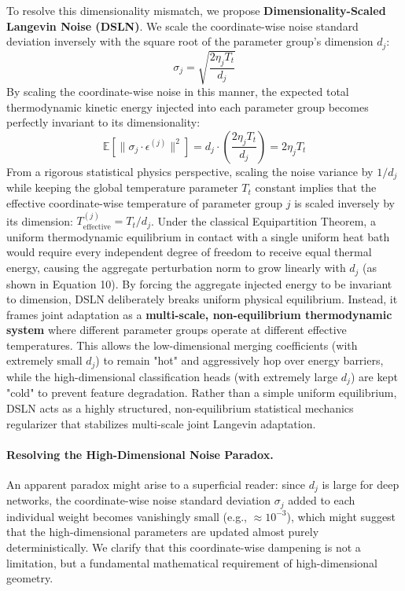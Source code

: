 To resolve this dimensionality mismatch, we propose \textbf{Dimensionality-Scaled Langevin Noise (DSLN)}.
We scale the coordinate-wise noise standard deviation inversely with the square root of the parameter group's dimension $d_j$:
\begin{equation}
    \sigma_j = \sqrt{\frac{2 \eta_j T_t}{d_j}}
\end{equation}
By scaling the coordinate-wise noise in this manner, the expected total thermodynamic kinetic energy injected into each parameter group becomes perfectly invariant to its dimensionality:
\begin{equation}
    \mathbb{E}\left[\|\sigma_j \cdot \epsilon^{(j)}\|^2\right] = d_j \cdot \left(\frac{2 \eta_j T_t}{d_j}\right) = 2 \eta_j T_t
\end{equation}
From a rigorous statistical physics perspective, scaling the noise variance by $1/d_j$ while keeping the global temperature parameter $T_t$ constant implies that the effective coordinate-wise temperature of parameter group $j$ is scaled inversely by its dimension: $T^{(j)}_{\text{effective}} = T_t / d_j$.
Under the classical Equipartition Theorem, a uniform thermodynamic equilibrium in contact with a single uniform heat bath would require every independent degree of freedom to receive equal thermal energy, causing the aggregate perturbation norm to grow linearly with $d_j$ (as shown in Equation 10).
By forcing the aggregate injected energy to be invariant to dimension, DSLN deliberately breaks uniform physical equilibrium.
Instead, it frames joint adaptation as a \textbf{multi-scale, non-equilibrium thermodynamic system} where different parameter groups operate at different effective temperatures.
This allows the low-dimensional merging coefficients (with extremely small $d_j$) to remain "hot" and aggressively hop over energy barriers, while the high-dimensional classification heads (with extremely large $d_j$) are kept "cold" to prevent feature degradation.
Rather than a simple uniform equilibrium, DSLN acts as a highly structured, non-equilibrium statistical mechanics regularizer that stabilizes multi-scale joint Langevin adaptation.

\paragraph{Resolving the High-Dimensional Noise Paradox.} An apparent paradox might arise to a superficial reader: since $d_j$ is large for deep networks, the coordinate-wise noise standard deviation $\sigma_j$ added to each individual weight becomes vanishingly small (e.g., $\approx 10^{-3}$), which might suggest that the high-dimensional parameters are updated almost purely deterministically.
We clarify that this coordinate-wise dampening is not a limitation, but a fundamental mathematical requirement of high-dimensional geometry.

